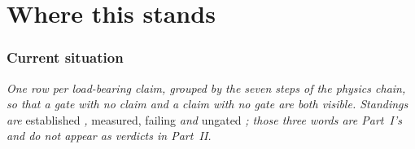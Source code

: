 %
%
\part{Where this stands}
\label{part:status}


\section{Current situation}
\label{sec:current-situation}

\emph{One row per load-bearing claim, grouped by the seven steps of the physics
chain, so that a gate with no claim and a claim with no gate are both visible.
Standings are} established \emph{,} measured, failing \emph{and} ungated
\emph{; those three words are Part~I's and do not appear as verdicts in
Part~II.}

